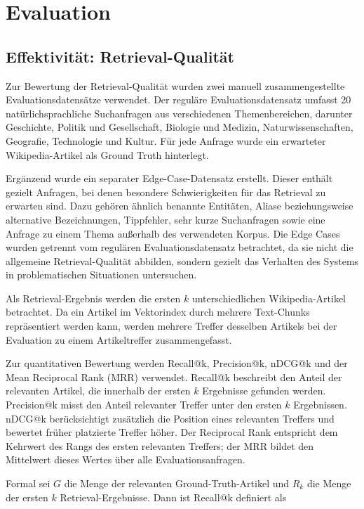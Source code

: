 \chapter{Evaluation}
\label{ch:evaluation}

\section{Effektivität: Retrieval-Qualität}

Zur Bewertung der Retrieval-Qualität wurden zwei manuell
zusammengestellte Evaluationsdatensätze verwendet. Der reguläre
Evaluationsdatensatz umfasst 20 natürlichsprachliche Suchanfragen aus
verschiedenen Themenbereichen, darunter Geschichte, Politik und Gesellschaft,
Biologie und Medizin, Naturwissenschaften, Geografie, Technologie und Kultur.
Für jede Anfrage wurde ein erwarteter Wikipedia-Artikel als Ground Truth
hinterlegt.

Ergänzend wurde ein separater Edge-Case-Datensatz erstellt. Dieser enthält
gezielt Anfragen, bei denen besondere Schwierigkeiten für das Retrieval zu
erwarten sind. Dazu gehören ähnlich benannte Entitäten, Aliase beziehungsweise
alternative Bezeichnungen, Tippfehler, sehr kurze Suchanfragen sowie eine
Anfrage zu einem Thema außerhalb des verwendeten Korpus. Die Edge Cases wurden getrennt
vom regulären Evaluationsdatensatz betrachtet, da sie nicht die allgemeine
Retrieval-Qualität abbilden, sondern gezielt das Verhalten des Systems in
problematischen Situationen untersuchen.

Als Retrieval-Ergebnis werden die ersten $k$ unterschiedlichen
Wikipedia-Artikel betrachtet. Da ein Artikel im Vektorindex durch mehrere
Text-Chunks repräsentiert werden kann, werden mehrere Treffer desselben
Artikels bei der Evaluation zu einem Artikeltreffer zusammengefasst.

Zur quantitativen Bewertung werden Recall@k, Precision@k, nDCG@k und der
Mean Reciprocal Rank (MRR) verwendet. Recall@k beschreibt den Anteil der
relevanten Artikel, die innerhalb der ersten $k$ Ergebnisse gefunden werden.
Precision@k misst den Anteil relevanter Treffer unter den ersten $k$
Ergebnissen. nDCG@k berücksichtigt zusätzlich die Position eines relevanten
Treffers und bewertet früher platzierte Treffer höher. Der Reciprocal Rank
entspricht dem Kehrwert des Rangs des ersten relevanten Treffers; der MRR
bildet den Mittelwert dieses Wertes über alle Evaluationsanfragen.

Formal sei $G$ die Menge der relevanten Ground-Truth-Artikel und
$R_k$ die Menge der ersten $k$ Retrieval-Ergebnisse. Dann ist Recall@k
definiert als

